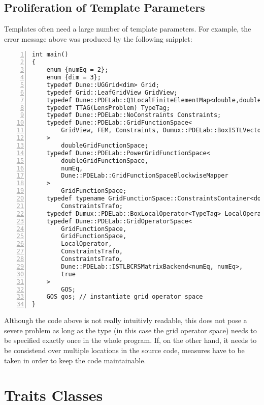 \subsection*{Proliferation of Template Parameters}

Templates often need a large number of template parameters. For
example, the error message above was produced by the following
snipplet:
\begin{lstlisting}[basicstyle=\ttfamily\scriptsize,numbers=left,numberstyle=\tiny, numbersep=5pt]
int main()
{
    enum {numEq = 2};
    enum {dim = 3};
    typedef Dune::UGGrid<dim> Grid;
    typedef Grid::LeafGridView GridView;
    typedef Dune::PDELab::Q1LocalFiniteElementMap<double,double,dim> FEM;
    typedef TTAG(LensProblem) TypeTag;
    typedef Dune::PDELab::NoConstraints Constraints;
    typedef Dune::PDELab::GridFunctionSpace<
        GridView, FEM, Constraints, Dumux::PDELab::BoxISTLVectorBackend<TypeTag>
    >
        doubleGridFunctionSpace;
    typedef Dune::PDELab::PowerGridFunctionSpace<
        doubleGridFunctionSpace,
        numEq,
        Dune::PDELab::GridFunctionSpaceBlockwiseMapper
    >
        GridFunctionSpace;
    typedef typename GridFunctionSpace::ConstraintsContainer<double>::Type 
        ConstraintsTrafo;
    typedef Dumux::PDELab::BoxLocalOperator<TypeTag> LocalOperator;
    typedef Dune::PDELab::GridOperatorSpace<
        GridFunctionSpace,
        GridFunctionSpace,
        LocalOperator,
        ConstraintsTrafo,
        ConstraintsTrafo,
        Dune::PDELab::ISTLBCRSMatrixBackend<numEq, numEq>,
        true
    >
        GOS;
    GOS gos; // instantiate grid operator space
}
\end{lstlisting}

Although the code above is not really intuitivly readable, this does
not pose a severe problem as long as the type (in this case the grid
operator space) needs to be specified exactly once in the whole
program. If, on the other hand, it needs to be consistend over
multiple locations in the source code, measures have to be taken in
order to keep the code maintainable. 

\section{Traits Classes}

